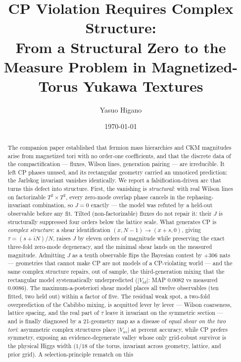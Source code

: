 \documentclass[aps,prd,preprint,nofootinbib]{revtex4-2}
\begin{document}
\title{CP Violation Requires Complex Structure:\\
From a Structural Zero to the Measure Problem in Magnetized-Torus Yukawa Textures}

\author{Yasuo Higano}

\date{\today}

\begin{abstract}
The companion paper established that fermion mass hierarchies and CKM
magnitudes arise from magnetized tori with no order-one coefficients, and that
the discrete data of the compactification --- fluxes, Wilson lines, generation
pairing --- are irreducible. It left CP phases unused, and its rectangular
geometry carried an unnoticed prediction: the Jarlskog invariant vanishes
identically. We report a falsification-driven arc that turns this defect into
structure. First, the vanishing is \emph{structural}: with real Wilson lines on
factorizable $T^2\times T^2$, every zero-mode overlap phase cancels in the
rephasing-invariant combination, so $J=0$ exactly --- the model was refuted by
a held-out observable before any fit. Tilted (non-factorizable) fluxes do not
repair it: their $J$ is structurally suppressed four orders below the lattice
scale. What generates CP is \emph{complex structure}: a shear identification
$(x,N-1)\to(x+s,0)$, giving $\tau=(s+iN)/N$, raises $J$ by eleven orders of
magnitude while preserving the exact three-fold zero-mode degeneracy, and the
minimal shear lands on the measured magnitude. Admitting $J$ as a tenth
observable flips the Bayesian contest by $+306$ nats --- geometries that cannot
make CP are not models of a CP-violating world --- and the same complex
structure repairs, out of sample, the third-generation mixing that the
rectangular model systematically underpredicted ($|V_{td}|$: MAP 0.0082 vs
measured 0.0086). The maximum-a-posteriori shear model places all twelve
observables (ten fitted, two held out) within a factor of five. The residual
weak spot, a two-fold overprediction of the Cabibbo mixing, is acquitted lever
by lever --- Wilson coarseness, lattice spacing, and the real part of $\tau$
leave it invariant on the symmetric section --- and is finally diagnosed by a
21-geometry map as a disease of \emph{equal shear on the two tori}: asymmetric
complex structures place $|V_{us}|$ at percent accuracy, while CP prefers
symmetry, exposing an evidence-degenerate valley whose only grid-robust
survivor is the physical Higgs width ($1/18$ of the torus, invariant across
geometry, lattice, and prior grid). A selection-principle rematch on this

\end{abstract}
\end{document}
